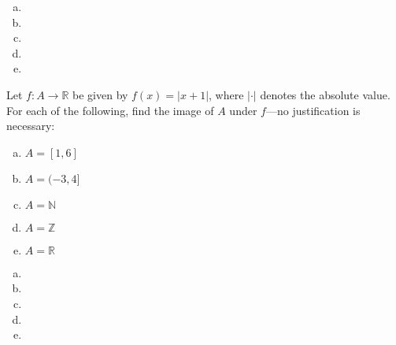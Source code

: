 \documentclass[11pt,letterpaper]{article}
\begin{document}
\sol
\begin{enumerate}[(a)]
\item 
\item 
\item 
\item 
\item 
\end{enumerate}



\newpage



 Let $f: A \to \mathbb{R}$ be given by $f(x)= |x + 1|$, where $| \cdot |$ denotes the absolute value. For each of the following, find the image of $A$ under $f$---no justification is necessary: 
	\begin{enumerate}[(a)]
	\item $A= [1, 6]$
	\item $A= (-3, 4]$
	\item $A= \mathbb{N}$
	\item $A= \mathbb{Z}$
	\item $A= \mathbb{R}$
	\end{enumerate} \pspace

\sol
\begin{enumerate}[(a)]
\item 
\item 
\item 
\item 
\item 
\end{enumerate}
\end{document}

